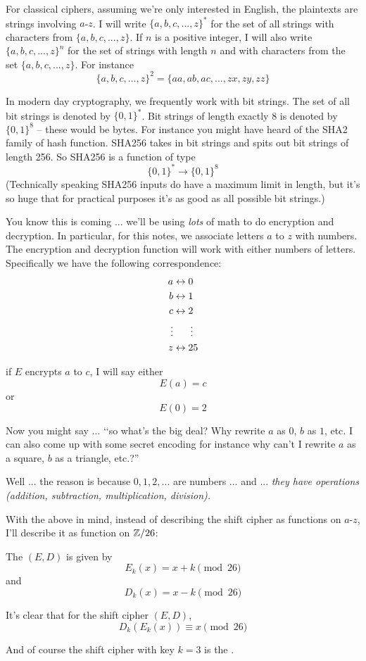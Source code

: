 For classical ciphers, assuming we're only interested in English,
the plaintexts are
strings involving $a$-$z$.
I will write $\{a,b,c,...,z\}^*$ for the set of all strings with
characters from $\{a,b,c,...,z\}$.
If $n$ is a positive integer, I will also write $\{a,b,c,...,z\}^n$
for the set of strings with length $n$ and with characters
from the set $\{a,b,c,...,z\}$.
For instance
\[
\{a,b,c,...,z\}^2 = \{aa, ab, ac, ..., zx, zy, zz\}
\]



In modern day cryptography, we frequently work with bit strings.
The set of all bit strings is denoted by $\{0,1\}^*$.
Bit strings of length exactly 8 is denoted by $\{0,1\}^8$ --
these would be bytes.
For instance you might have heard of the SHA2 family of hash function.
SHA256 takes in bit strings and spits out bit strings of length 256.
So SHA256 is a function of type
\[
\{0,1\}^* \rightarrow \{0,1\}^8
\]
(Technically speaking SHA256 inputs do have a maximum limit in length,
but it's so huge that for practical purposes it's as good as all possible bit
strings.)

You know this is coming ... we'll be using
\textit{lots} of math to do 
encryption and decryption.
In particular, for this notes, we associate letters $a$ to $z$ with numbers.
The encryption and decryption function will work with either numbers of 
letters.
Specifically we have the following correspondence:
\begin{align*}
a &\leftrightarrow 0 \\
b &\leftrightarrow 1 \\
c &\leftrightarrow 2 \\
\vdots  &\textwhite{\leftarrow 2} \vdots \\
z &\leftrightarrow 25
\end{align*}

if $E$ encrypts $a$ to $c$, I will say either 
\[
E(a) = c
\]
or 
\[
E(0) = 2
\]

Now you might say ... \lq\lq so what's the big deal? 
Why rewrite $a$ as $0$,  $b$ as $1$, etc.
I can also come up with some secret encoding for instance
why can't I rewrite $a$ as a square, $b$ as a triangle, etc.?''

Well ... the reason is because $0, 1, 2, ...$ are numbers ... and ...
\textit{they have operations (addition, subtraction, multiplication, division).}

With the above in mind, instead of describing the shift cipher as
functions on $a$-$z$, I'll describe it as function on $\mathbb Z/26$:

\begin{defn}
The  $(E, D)$ is given by
\[
  E_k(x) = x + k \pmod{26}
\]
and
\[
  D_k(x) = x - k \pmod{26}
\]
\end{defn}

It's clear that for the shift cipher $(E, D)$,
\[
D_k(E_k(x)) \equiv x \pmod{26}
\]

And of course the shift cipher with key $k = 3$ is the .
